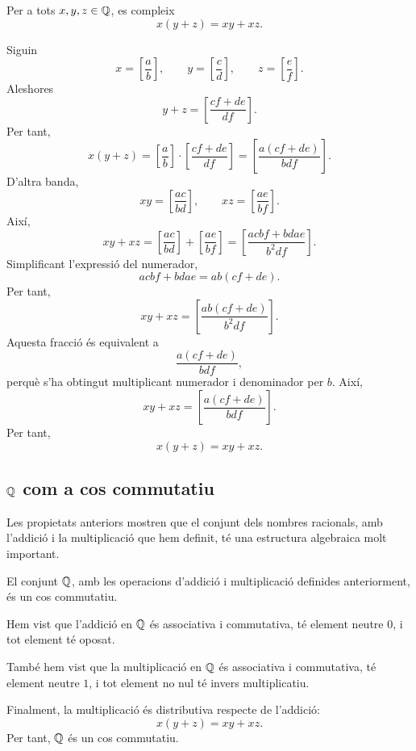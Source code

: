\begin{proposicio}
Per a tots \(x,y,z\in\mathbb{Q}\), es compleix
\[
	x(y+z)=xy+xz.
\]
\end{proposicio}

\begin{prova}
Siguin
\[
	x=\left[\frac{a}{b}\right],
	\qquad
	y=\left[\frac{c}{d}\right],
	\qquad
	z=\left[\frac{e}{f}\right].
\]
Aleshores
\[
	y+z
	=
	\left[\frac{cf+de}{df}\right].
\]
Per tant,
\[
	x(y+z)
	=
	\left[\frac{a}{b}\right]
	\cdot
	\left[\frac{cf+de}{df}\right]
	=
	\left[\frac{a(cf+de)}{bdf}\right].
\]
D'altra banda,
\[
	xy
	=
	\left[\frac{ac}{bd}\right],
	\qquad
	xz
	=
	\left[\frac{ae}{bf}\right].
\]
Així,
\[
	xy+xz
	=
	\left[\frac{ac}{bd}\right]
	+
	\left[\frac{ae}{bf}\right]
	=
	\left[\frac{acbf+bdae}{b^2df}\right].
\]
Simplificant l'expressió del numerador,
\[
	acbf+bdae
	=
	ab(cf+de).
\]
Per tant,
\[
	xy+xz
	=
	\left[\frac{ab(cf+de)}{b^2df}\right].
\]
Aquesta fracció és equivalent a
\[
	\frac{a(cf+de)}{bdf},
\]
perquè s'ha obtingut multiplicant numerador i denominador per \(b\). Així,
\[
	xy+xz
	=
	\left[\frac{a(cf+de)}{bdf}\right].
\]
Per tant,
\[
	x(y+z)=xy+xz.
\]
\end{prova}

\subsection{\texorpdfstring{\ensuremath{\Q}}{Q} com a cos commutatiu}

Les propietats anteriors mostren que el conjunt dels nombres racionals, amb l'addició i la multiplicació que hem definit, té una estructura algebraica molt important.

\begin{proposicio}
El conjunt \(\mathbb{Q}\), amb les operacions d'addició i multiplicació definides anteriorment, és un cos commutatiu.
\end{proposicio}

\begin{prova}
Hem vist que l'addició en \(\mathbb{Q}\) és associativa i commutativa, té element neutre \(0\), i tot element té oposat.

També hem vist que la multiplicació en \(\mathbb{Q}\) és associativa i commutativa, té element neutre \(1\), i tot element no nul té invers multiplicatiu.

Finalment, la multiplicació és distributiva respecte de l'addició:
\[
	x(y+z)=xy+xz.
\]
Per tant, \(\mathbb{Q}\) és un cos commutatiu.
\end{prova}

